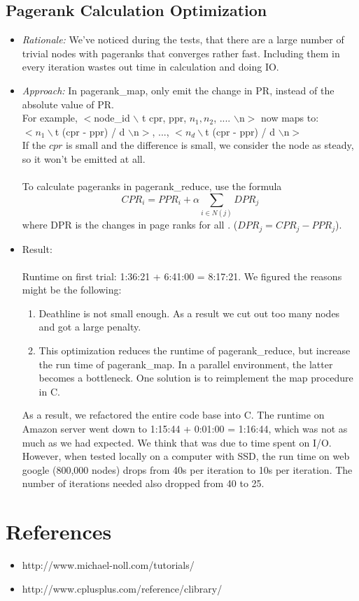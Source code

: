 \documentclass[12pt]{article}
\begin{document}
\subsection{Pagerank Calculation Optimization}
\begin{itemize}
\item \emph{Rationale:} 
We've noticed during the tests, that there are a large number of trivial nodes with pageranks that converges rather fast. Including them in every iteration wastes out time in calculation and doing IO.
\item  \emph{Approach:} 
In pagerank\_map, only emit the change in PR, instead of the absolute value of PR.  \\
For example,  $<$node\_id $\backslash$ t cpr, ppr, $n_1, n_2$, .... $\backslash$n$>$
now maps to:\\
$<n_1 \backslash$t  (cpr - ppr) / d $\backslash$n$>$,  ..., $<n_d \backslash$t  (cpr - ppr) / d  $\backslash$n$>$ \\
If the $cpr$ is small and the difference is small, we consider the node as steady, so it won't be emitted at all. \\\\
To calculate pageranks in pagerank\_reduce, use the formula 
\[CPR_i = PPR_i + \alpha\sum_{i \in N(j)} DPR_j\]
where DPR is the changes in page ranks for all . ($DPR_j = CPR_j - PPR_j$).

\item Result:\\\\
Runtime on first trial: 1:36:21  +  6:41:00  =  8:17:21. We figured the reasons might be the following:
\begin{enumerate}
\item Deathline is not small enough. As a result we cut out too many nodes and got a large penalty. 
\item This optimization reduces the runtime of pagerank\_reduce, but increase the run time of pagerank\_map. In a parallel environment, the latter becomes a bottleneck. One solution is to reimplement the map procedure in C.
\end{enumerate}
As a result, we refactored the entire code base into C.  The runtime on Amazon server went down to  1:15:44  +  0:01:00  =  1:16:44, which was not as much as we had expected. We think that was due to time spent on I/O. However, when tested locally on a computer with SSD, the run time on web google (800,000 nodes) drops from 40s per iteration to 10s per iteration. The number of iterations needed also dropped from 40 to 25.\\

\end{itemize}

\section{References}
\begin{itemize}
\item http://www.michael-noll.com/tutorials/
\item http://www.cplusplus.com/reference/clibrary/
\end{itemize}
\end{document}
